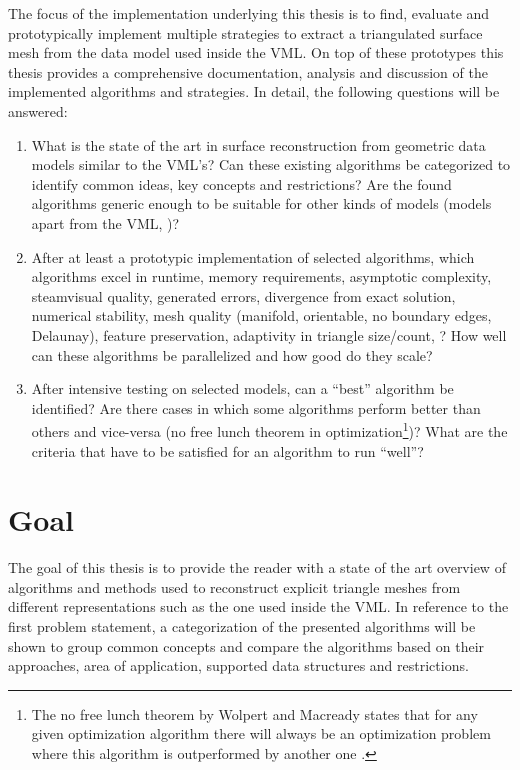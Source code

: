 The focus of the implementation underlying this thesis is to find, evaluate and prototypically implement multiple strategies to extract a triangulated surface mesh from the data model used inside the VML.
On top of these prototypes this thesis provides a comprehensive documentation, analysis and discussion of the implemented algorithms and strategies.
In detail, the following questions will be answered:

\begin{enumerate}
	\item What is the state of the art in surface reconstruction from geometric data models similar to the VML's?
	Can these existing algorithms be categorized to identify common ideas, key concepts and restrictions?
	Are the found algorithms generic enough to be suitable for other kinds of models (models apart from the VML, \cf)?
	
	\item After at least a prototypic implementation of selected algorithms, which algorithms excel in runtime, memory requirements, asymptotic complexity, steamvisual quality, generated errors, divergence from exact solution, numerical stability, mesh quality (manifold, orientable, no boundary edges, Delaunay), feature preservation, adaptivity in triangle size/count, \etc?
	How well can these algorithms be parallelized and how good do they scale?
	
	\item After intensive testing on selected models, can a \enquote{best} algorithm be identified?
	Are there cases in which some algorithms perform better than others and vice-versa (\cf no free lunch theorem in optimization\footnote{The no free lunch theorem by Wolpert and Macready states that for any given optimization algorithm there will always be an optimization problem where this algorithm is outperformed by another one \cite{no_free_lunch}.})?
	What are the criteria that have to be satisfied for an algorithm to run \enquote{well}?
\end{enumerate}


\section{Goal}
\label{sec:goal}

The goal of this thesis is to provide the reader with a state of the art overview of algorithms and methods used to reconstruct explicit triangle meshes from different representations such as the one used inside the VML.
In reference to the first problem statement, a categorization of the presented algorithms will be shown to group common concepts and compare the algorithms based on their approaches, area of application, supported data structures and restrictions.

